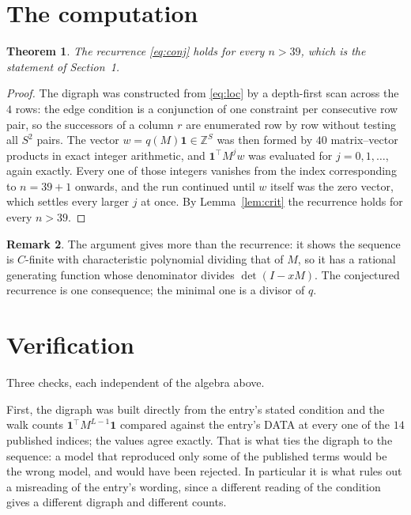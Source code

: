 \documentclass[11pt,a4paper]{article}
\theoremstyle{plain}
\newtheorem{theorem}{Theorem}
\theoremstyle{definition}
\newtheorem{remark}[theorem]{Remark}
\begin{document}
\section{The computation}

\begin{theorem}
The recurrence \eqref{eq:conj} holds for every $n>39$, which is the statement of
Section~1.
\end{theorem}

\begin{proof}
The digraph was constructed from \eqref{eq:loc} by a depth-first scan across the $4$
rows: the edge condition is a conjunction of one constraint per consecutive row
pair, so the successors of a column $r$ are enumerated row by row without testing all
$S^2$ pairs. The vector $w=q(M)\mathbf{1}\in\mathbb{Z}^{S}$ was then formed by $40$
matrix--vector products in exact integer arithmetic, and $\mathbf{1}^{\!\top}M^{j}w$ was
evaluated for $j=0,1,\dots$, again exactly. Every one of those integers vanishes from the
index corresponding to $n=39+1$ onwards, and the run continued until $w$ itself was the
zero vector, which settles every larger $j$ at once. By Lemma~\ref{lem:crit} the recurrence
holds for every $n>39$.
\end{proof}

\begin{remark}
The argument gives more than the recurrence: it shows the sequence is $C$-finite with
characteristic polynomial dividing that of $M$, so it has a rational generating function
whose denominator divides $\det(I-xM)$. The conjectured recurrence is one consequence; the
minimal one is a divisor of $q$.
\end{remark}

\section{Verification}

Three checks, each independent of the algebra above.

First, the digraph was built directly from the entry's stated condition and the walk counts
$\mathbf{1}^{\!\top}M^{L-1}\mathbf{1}$ compared against the entry's DATA at
every one of the $14$ published indices; the values agree exactly. That is what ties
the digraph to the sequence: a model that reproduced only some of the published terms would
be the wrong model, and would have been rejected. In particular it is what rules out a
misreading of the entry's wording, since a different reading of the condition gives a
different digraph and different counts.
\end{document}
